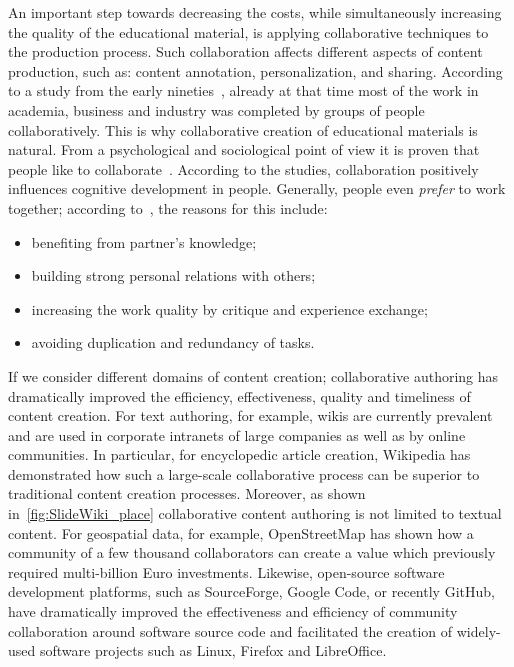 \documentclass[PhD, Submit, ngerman,UKenglish,table]{scrbook}
\begin{document}
An important step towards decreasing the costs, while simultaneously increasing the quality of the educational material, is applying collaborative techniques to the production process.
Such collaboration affects different aspects of content production, such as: content annotation, personalization, and sharing.
According to a study from the early nineties~\cite{posner1992people}, already at that time most of the work in academia, business and industry was completed by groups of people collaboratively.
This is why collaborative creation of educational materials is natural.
From a psychological and sociological point of view it is proven that people like to collaborate~\cite{smith1995cooperative, Halimi2011}.
According to the studies, collaboration positively influences cognitive development in people.
Generally, people even \emph{prefer} to work together; 
according to~\cite{smith1995cooperative, Halimi2011}, the reasons for this include:

\begin{itemize}
\item benefiting from partner's knowledge;
\item building strong personal relations with others;
\item increasing the work quality by critique and experience exchange;
\item avoiding duplication and redundancy of tasks.
\end{itemize}

If we consider different domains of content creation; collaborative authoring has dramatically improved the efficiency, effectiveness, quality and timeliness of content creation.
For text authoring, for example, wikis are currently prevalent and are used in corporate intranets of large companies as well as by online communities.
In particular, for encyclopedic article creation, Wikipedia has demonstrated how such a large-scale collaborative process can be superior to traditional content creation processes.
Moreover, as shown in~\autoref{fig:SlideWiki_place} collaborative content authoring is not limited to textual content.
For geospatial data, for example, OpenStreetMap has shown how a community of a few thousand collaborators can create a value which previously required multi-billion Euro investments.
Likewise, open-source software development platforms, such as SourceForge, Google Code, or recently GitHub, have dramatically improved the effectiveness and efficiency of community collaboration around software source code and facilitated the creation of widely-used software projects such as Linux, Firefox and LibreOffice.
\end{document}
